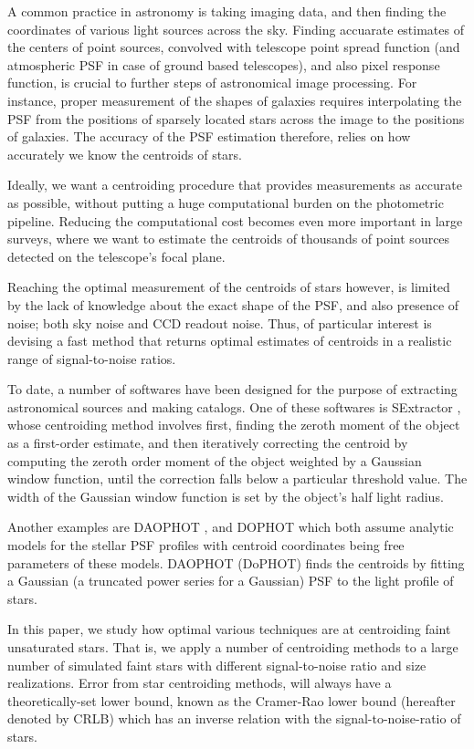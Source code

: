 \documentclass[12pt, preprint]{aastex}
\begin{document}
A common practice in astronomy is taking imaging data, and then finding the coordinates
of various light sources across the sky. Finding accuarate estimates of the centers of point
sources, convolved with telescope point spread function (and atmospheric PSF in case of
ground based telescopes), and also pixel response function, is crucial to further steps of
astronomical image processing. For instance, proper measurement of the shapes of galaxies
requires interpolating the PSF from the positions of sparsely located stars across the
image to the positions of galaxies. The accuracy of the PSF estimation therefore,
relies on how accurately we know the centroids of stars. 

Ideally, we want a centroiding procedure that provides measurements as accurate as possible,
without putting a huge computational burden on the photometric pipeline.
Reducing the computational cost becomes even more important in large surveys,
where we want to estimate the centroids of thousands of point sources detected
on the telescope's focal plane. 

Reaching the optimal measurement of the centroids of stars however, is limited
by the lack of knowledge about the exact shape of the PSF, and also presence of noise;
both sky noise and CCD readout noise. Thus, of particular interest is devising a fast method that returns
optimal estimates of centroids in a realistic range of signal-to-noise ratios.

To date, a number of softwares have been designed for the purpose of extracting astronomical
sources and making catalogs. One of these softwares is SExtractor \citep{sex},
whose centroiding method involves first, finding the zeroth moment of the object
as a first-order estimate, and then iteratively correcting the centroid by computing
the zeroth order moment of the object weighted by a Gaussian window function,
until the correction falls below a particular threshold value.
The width of the Gaussian window function is set by the object's half light radius.

Another examples are DAOPHOT \citep{daophot}, and DOPHOT \citep{dophot}
which both assume analytic models for the stellar PSF profiles with centroid
coordinates being free parameters of these models.
DAOPHOT (DoPHOT) finds the centroids by fitting a Gaussian (a truncated power series for a Gaussian) PSF to
the light profile of stars.

In this paper, we study how optimal various techniques are at centroiding 
faint unsaturated stars. That is, we apply a number of centroiding methods 
to a large number of simulated faint stars with different signal-to-noise ratio and
 size realizations. Error from star centroiding methods, will always have 
a theoretically-set lower bound, known as the Cramer-Rao lower bound
(hereafter denoted by CRLB) which has an inverse relation with the
signal-to-noise-ratio of stars.
\end{document}
